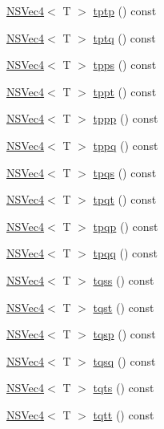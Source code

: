 \begin{DoxyCompactItemize}
\item 
\hyperlink{structNSVec4}{N\-S\-Vec4}$<$ T $>$ \hyperlink{structNSVec4_a6ee8971bd6ab909b5507fe25f60fb403}{tptp} () const 
\item 
\hyperlink{structNSVec4}{N\-S\-Vec4}$<$ T $>$ \hyperlink{structNSVec4_a1bb5feac6dab25886bc4d032e14f7d1f}{tptq} () const 
\item 
\hyperlink{structNSVec4}{N\-S\-Vec4}$<$ T $>$ \hyperlink{structNSVec4_a8ce67e52402d1c32bfe5978dd3b74fe3}{tpps} () const 
\item 
\hyperlink{structNSVec4}{N\-S\-Vec4}$<$ T $>$ \hyperlink{structNSVec4_a91c0f8152510554e6c3b23c8628243b4}{tppt} () const 
\item 
\hyperlink{structNSVec4}{N\-S\-Vec4}$<$ T $>$ \hyperlink{structNSVec4_af6e5e8337c17a979809b7640a4b09c1a}{tppp} () const 
\item 
\hyperlink{structNSVec4}{N\-S\-Vec4}$<$ T $>$ \hyperlink{structNSVec4_a2226f43c44b38f1c55ba5cc04807d58b}{tppq} () const 
\item 
\hyperlink{structNSVec4}{N\-S\-Vec4}$<$ T $>$ \hyperlink{structNSVec4_a2f69cb0deafe2d28ba57cc33eca419bf}{tpqs} () const 
\item 
\hyperlink{structNSVec4}{N\-S\-Vec4}$<$ T $>$ \hyperlink{structNSVec4_a8ab81cd203c68cb89ed345cb978a380d}{tpqt} () const 
\item 
\hyperlink{structNSVec4}{N\-S\-Vec4}$<$ T $>$ \hyperlink{structNSVec4_acf73b11283b64960eaa7cf6afbfd2bac}{tpqp} () const 
\item 
\hyperlink{structNSVec4}{N\-S\-Vec4}$<$ T $>$ \hyperlink{structNSVec4_aa129720fafe0b0c6e2aa13187583e9c4}{tpqq} () const 
\item 
\hyperlink{structNSVec4}{N\-S\-Vec4}$<$ T $>$ \hyperlink{structNSVec4_afaca5d34a5ec26c1d7d9ea2c74ea710b}{tqss} () const 
\item 
\hyperlink{structNSVec4}{N\-S\-Vec4}$<$ T $>$ \hyperlink{structNSVec4_ac23d822c35da0f3fe4b0aa60ae255a57}{tqst} () const 
\item 
\hyperlink{structNSVec4}{N\-S\-Vec4}$<$ T $>$ \hyperlink{structNSVec4_aa47114604b67bebb65faf03ba58c53e6}{tqsp} () const 
\item 
\hyperlink{structNSVec4}{N\-S\-Vec4}$<$ T $>$ \hyperlink{structNSVec4_a8e9b40cc8f0c02a8107d28ec982d9a00}{tqsq} () const 
\item 
\hyperlink{structNSVec4}{N\-S\-Vec4}$<$ T $>$ \hyperlink{structNSVec4_a600cf9466ca34c84a8144ef8b6f83215}{tqts} () const 
\item 
\hyperlink{structNSVec4}{N\-S\-Vec4}$<$ T $>$ \hyperlink{structNSVec4_a6fa66d13b097be5afc96338606406ccb}{tqtt} () const 

\end{DoxyCompactItemize}
